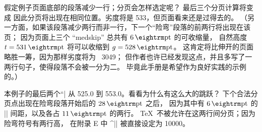 \ddangerexercise 假定例子页面底部的段落减少一行；分页会怎样选定呢？
\answer 最后三个分页计算将变成
\begintt
\endtt
因此分页将出现在相同位置。劣度将是 533，但页面看来还是过得去的。%
（另一方面，如果该段落减少两行而非一行，下一个``险弯''段落的前两行将出现在该页；
因为页面上三个 ``medskip'' 总共有 $6\pt$ 的可收缩量，
自然高度 $t=531\pt$ 将可以收缩到 $g=528\pt$。
这肯定将比伸开的页面略胜一筹，因为那样劣度将为 ~3049；
但作者也许已经发现这点，并且多写了一两行句子，使得段落不会被一分为二。
毕竟此手册是希望作为良好实践的示例的。）

\ddangerexercise 本例子的最后两个``|%
从 525.0 到 553.0。看看为什么有这么大的跳跃？
\answer 下个合法分页点出现在险弯段落开始后的 $28\pt$ 之后，
因为其中有 $6\pt$ 的 |\medskip| 间距，以及各占 $11\pt$ 的两行。
\TeX\ 不被允许在这两行间分页；因为险弯符号有两行高，
在附录 E 中 ^|\clubpenalty| 被直接设定为 10000。

